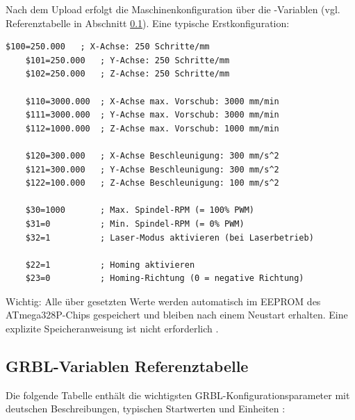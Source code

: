 Nach dem Upload erfolgt die Maschinenkonfiguration über die \PYTHON{\$\$}-Variablen (vgl. Referenztabelle in Abschnitt \ref{sec:grbl_referenztabelle}). Eine typische Erstkonfiguration:

\begin{lstlisting}[caption={Typische Erstkonfiguration von GRBL},label={lst:grbl_erstkonfiguration}]
	$100=250.000   ; X-Achse: 250 Schritte/mm
	$101=250.000   ; Y-Achse: 250 Schritte/mm
	$102=250.000   ; Z-Achse: 250 Schritte/mm
	
	$110=3000.000  ; X-Achse max. Vorschub: 3000 mm/min
	$111=3000.000  ; Y-Achse max. Vorschub: 3000 mm/min
	$112=1000.000  ; Z-Achse max. Vorschub: 1000 mm/min
	
	$120=300.000   ; X-Achse Beschleunigung: 300 mm/s^2
	$121=300.000   ; Y-Achse Beschleunigung: 300 mm/s^2
	$122=100.000   ; Z-Achse Beschleunigung: 100 mm/s^2
	
	$30=1000       ; Max. Spindel-RPM (= 100% PWM)
	$31=0          ; Min. Spindel-RPM (= 0% PWM)
	$32=1          ; Laser-Modus aktivieren (bei Laserbetrieb)
	
	$22=1          ; Homing aktivieren
	$23=0          ; Homing-Richtung (0 = negative Richtung)
\end{lstlisting}

Wichtig: Alle über  gesetzten Werte werden automatisch im EEPROM des ATmega328P-Chips gespeichert und bleiben nach einem Neustart erhalten. Eine explizite Speicheranweisung ist nicht erforderlich \cite{sainsmart:grblquickreference}.

\subsection{GRBL-Variablen Referenztabelle}
\label{sec:grbl_referenztabelle}

Die folgende Tabelle enthält die wichtigsten GRBL-Konfigurationsparameter mit deutschen Beschreibungen, typischen Startwerten und Einheiten \cite{sainsmart:grblquickreference}:

